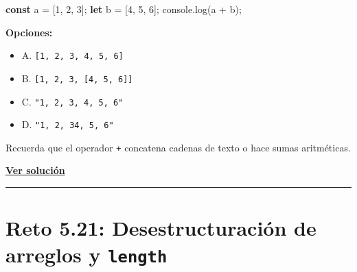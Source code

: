 \documentclass[
  letterpaper,
  DIV=11,
  numbers=noendperiod]{scrreprt}
\newenvironment{Shaded}{\begin{snugshade}}{\end{snugshade}}
\newcommand{\BuiltInTok}[1]{\textcolor[rgb]{0.00,0.23,0.31}{#1}}
\newcommand{\DecValTok}[1]{\textcolor[rgb]{0.68,0.00,0.00}{#1}}
\newcommand{\FunctionTok}[1]{\textcolor[rgb]{0.28,0.35,0.67}{#1}}
\newcommand{\KeywordTok}[1]{\textcolor[rgb]{0.00,0.23,0.31}{\textbf{#1}}}
\newcommand{\NormalTok}[1]{\textcolor[rgb]{0.00,0.23,0.31}{#1}}
\newcommand{\OperatorTok}[1]{\textcolor[rgb]{0.37,0.37,0.37}{#1}}
\providecommand{\tightlist}{%
  \setlength{\itemsep}{0pt}\setlength{\parskip}{0pt}}
\begin{document}
\begin{Shaded}
\begin{Highlighting}[]
\KeywordTok{const}\NormalTok{ a }\OperatorTok{=}\NormalTok{ [}\DecValTok{1}\OperatorTok{,} \DecValTok{2}\OperatorTok{,} \DecValTok{3}\NormalTok{]}\OperatorTok{;}
\KeywordTok{let}\NormalTok{ b }\OperatorTok{=}\NormalTok{ [}\DecValTok{4}\OperatorTok{,} \DecValTok{5}\OperatorTok{,} \DecValTok{6}\NormalTok{]}\OperatorTok{;}
\BuiltInTok{console}\OperatorTok{.}\FunctionTok{log}\NormalTok{(a }\OperatorTok{+}\NormalTok{ b)}\OperatorTok{;}
\end{Highlighting}
\end{Shaded}

\textbf{Opciones:}

\begin{itemize}
\tightlist
\item
  A. \texttt{{[}1,\ 2,\ 3,\ 4,\ 5,\ 6{]}}
\item
  B. \texttt{{[}1,\ 2,\ 3,\ {[}4,\ 5,\ 6{]}{]}}
\item
  C. \texttt{"1,\ 2,\ 3,\ 4,\ 5,\ 6"}
\item
  D. \texttt{"1,\ 2,\ 34,\ 5,\ 6"}
\end{itemize}

\begin{tcolorbox}[enhanced jigsaw, left=2mm, toprule=.15mm, leftrule=.75mm, breakable, colback=white, coltitle=black, bottomtitle=1mm, arc=.35mm, rightrule=.15mm, colframe=quarto-callout-tip-color-frame, opacitybacktitle=0.6, toptitle=1mm, opacityback=0, titlerule=0mm, title=\textcolor{quarto-callout-tip-color}{\faLightbulb}\hspace{0.5em}{Pista}, bottomrule=.15mm, colbacktitle=quarto-callout-tip-color!10!white]

Recuerda que el operador \texttt{+} concatena cadenas de texto o hace
sumas aritméticas.

\end{tcolorbox}

\textbf{\hyperref[sec-sol-cap5-reto20]{Ver solución}}

\begin{center}\rule{0.5\linewidth}{0.5pt}\end{center}

\section{\texorpdfstring{Reto 5.21: Desestructuración de arreglos y
\texttt{length}}{Reto 5.21: Desestructuración de arreglos y length}}\label{sec-cap5-reto21}
\end{document}
